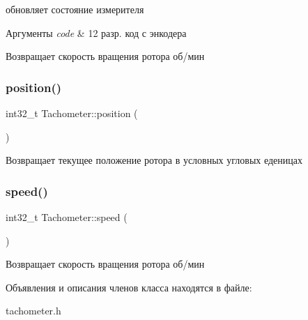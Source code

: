 обновляет состояние измерителя 


\begin{DoxyParams}{Аргументы}
{\em code} & 12 разр. код с энкодера \\
\hline
\end{DoxyParams}
\begin{DoxyReturn}{Возвращает}
скорость вращения ротора об/мин 
\end{DoxyReturn}
\mbox{\label{classTachometer_a8d5931092b8a8029d93c6464d80a57bc}} 
\subsubsection{\texorpdfstring{position()}{position()}}
{\footnotesize\ttfamily int32\+\_\+t Tachometer\+::position (\begin{DoxyParamCaption}{ }\end{DoxyParamCaption})\hspace{0.3cm}{\ttfamily [inline]}}

\begin{DoxyReturn}{Возвращает}
текущее положение ротора в условных угловых еденицах 
\end{DoxyReturn}
\mbox{\label{classTachometer_a0610c20594dac7015423e0d2862bba12}} 
\subsubsection{\texorpdfstring{speed()}{speed()}}
{\footnotesize\ttfamily int32\+\_\+t Tachometer\+::speed (\begin{DoxyParamCaption}{ }\end{DoxyParamCaption})\hspace{0.3cm}{\ttfamily [inline]}}

\begin{DoxyReturn}{Возвращает}
скорость вращения ротора об/мин 
\end{DoxyReturn}


Объявления и описания членов класса находятся в файле\+:\begin{DoxyCompactItemize}
\item 
tachometer.\+h\end{DoxyCompactItemize}
